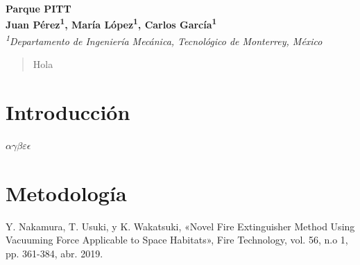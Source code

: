\documentclass[letterpaper,12pt]{article}
\newcommand\authormark[1]{\textsuperscript{#1}}
\begin{document}
\thispagestyle{firstpage}

\begin{center}
{\Large\textbf{Parque PITT}}\\[0.5cm]
\textbf{
Juan Pérez\authormark{1}, María López\authormark{1}, Carlos García\authormark{1}}\\[0.3cm]
{\small\textit{\authormark{1}Departamento de Ingeniería Mecánica, Tecnológico de Monterrey, México}}\\

\end{center}

\vspace{1cm}

\begin{abstract}
    Hola
\end{abstract}

\begin{multicols}{2}

\section{Introducción}
\(\alpha \gamma \beta \varepsilon \epsilon \)
\section{Metodología}


\begin{thebibliography}{15}

Y. Nakamura, T. Usuki, y K. Wakatsuki, «Novel Fire Extinguisher Method Using Vacuuming Force Applicable to Space Habitats», Fire Technology, vol. 56, n.o 1, pp. 361-384, abr. 2019.

\end{thebibliography}

\end{multicols}
\end{document}
